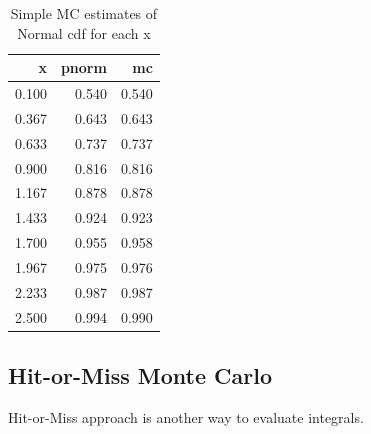 \documentclass[]{book}
\newenvironment{Shaded}{\begin{snugshade}}{\end{snugshade}}
\newcommand{\DataTypeTok}[1]{\textcolor[rgb]{0.13,0.29,0.53}{#1}}
\newcommand{\DecValTok}[1]{\textcolor[rgb]{0.00,0.00,0.81}{#1}}
\newcommand{\FloatTok}[1]{\textcolor[rgb]{0.00,0.00,0.81}{#1}}
\newcommand{\KeywordTok}[1]{\textcolor[rgb]{0.13,0.29,0.53}{\textbf{#1}}}
\newcommand{\NormalTok}[1]{#1}
\newcommand{\OperatorTok}[1]{\textcolor[rgb]{0.81,0.36,0.00}{\textbf{#1}}}
\newcommand{\StringTok}[1]{\textcolor[rgb]{0.31,0.60,0.02}{#1}}
\theoremstyle{definition}
\theoremstyle{definition}
\theoremstyle{definition}
\theoremstyle{remark}
\begin{document}
\begin{Shaded}
\end{Shaded}

\begin{longtable}{r|r|r}
\caption{\label{tab:unnamed-chunk-39}Simple MC estimates of Normal cdf for each x}\\
\hline
x & pnorm & mc\\
\hline
0.100 & 0.540 & 0.540\\
\hline
0.367 & 0.643 & 0.643\\
\hline
0.633 & 0.737 & 0.737\\
\hline
0.900 & 0.816 & 0.816\\
\hline
1.167 & 0.878 & 0.878\\
\hline
1.433 & 0.924 & 0.923\\
\hline
1.700 & 0.955 & 0.958\\
\hline
1.967 & 0.975 & 0.976\\
\hline
2.233 & 0.987 & 0.987\\
\hline
2.500 & 0.994 & 0.990\\
\hline
\end{longtable}

\hypertarget{hit-or-miss-monte-carlo}{%
\subsection{Hit-or-Miss Monte Carlo}\label{hit-or-miss-monte-carlo}}

Hit-or-Miss approach is another way to evaluate integrals.
\end{document}
